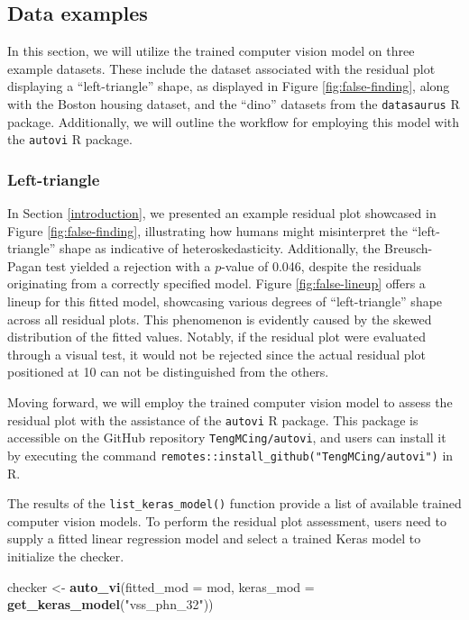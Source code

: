 \documentclass[]{interact}
\theoremstyle{plain}%
\theoremstyle{definition}
\theoremstyle{remark}
\newenvironment{Shaded}{\begin{snugshade}}{\end{snugshade}}
\newcommand{\AttributeTok}[1]{\textcolor[rgb]{0.13,0.29,0.53}{#1}}
\newcommand{\FunctionTok}[1]{\textcolor[rgb]{0.13,0.29,0.53}{\textbf{#1}}}
\newcommand{\NormalTok}[1]{#1}
\newcommand{\OtherTok}[1]{\textcolor[rgb]{0.56,0.35,0.01}{#1}}
\newcommand{\StringTok}[1]{\textcolor[rgb]{0.31,0.60,0.02}{#1}}
\begin{document}
\subsection{Data examples}\label{data-examples}

In this section, we will utilize the trained computer vision model on
three example datasets. These include the dataset associated with the
residual plot displaying a ``left-triangle'' shape, as displayed in
Figure \ref{fig:false-finding}, along with the Boston housing dataset,
and the ``dino'' datasets from the \texttt{datasaurus} R package.
Additionally, we will outline the workflow for employing this model with
the \texttt{autovi} R package.

\subsubsection{Left-triangle}\label{left-triangle}

In Section \ref{introduction}, we presented an example residual plot
showcased in Figure \ref{fig:false-finding}, illustrating how humans
might misinterpret the ``left-triangle'' shape as indicative of
heteroskedasticity. Additionally, the Breusch-Pagan test yielded a
rejection with a \(p\)-value of 0.046, despite the residuals originating
from a correctly specified model. Figure \ref{fig:false-lineup} offers a
lineup for this fitted model, showcasing various degrees of
``left-triangle'' shape across all residual plots. This phenomenon is
evidently caused by the skewed distribution of the fitted values.
Notably, if the residual plot were evaluated through a visual test, it
would not be rejected since the actual residual plot positioned at 10
can not be distinguished from the others.

Moving forward, we will employ the trained computer vision model to
assess the residual plot with the assistance of the \texttt{autovi} R
package. This package is accessible on the GitHub repository
\texttt{TengMCing/autovi}, and users can install it by executing the
command \texttt{remotes::install\_github("TengMCing/autovi")} in R.

The results of the \texttt{list\_keras\_model()} function provide a list
of available trained computer vision models. To perform the residual
plot assessment, users need to supply a fitted linear regression model
and select a trained Keras model to initialize the checker.

\begin{Shaded}
\begin{Highlighting}[]
\NormalTok{checker }\OtherTok{\textless{}{-}} \FunctionTok{auto\_vi}\NormalTok{(}\AttributeTok{fitted\_mod =}\NormalTok{ mod, }
                   \AttributeTok{keras\_mod =} \FunctionTok{get\_keras\_model}\NormalTok{(}\StringTok{"vss\_phn\_32"}\NormalTok{))}
\end{Highlighting}
\end{Shaded}
\end{document}
